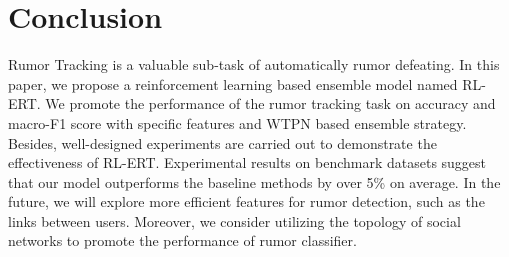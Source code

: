 \section{Conclusion}
\label{sec:conclusion}
Rumor Tracking is a valuable sub-task of automatically rumor defeating. In this paper, we propose a reinforcement learning based ensemble model named RL-ERT. We promote the performance of the rumor tracking task on accuracy and macro-F1 score with specific features and WTPN based ensemble strategy. Besides, well-designed experiments are carried out to demonstrate the effectiveness of RL-ERT. Experimental results on benchmark datasets suggest that our model outperforms the baseline methods by over 5\% on average. In the future, we will explore more efficient features for rumor detection, such as the links between users. Moreover, we consider utilizing the topology of social networks to promote the performance of rumor classifier.